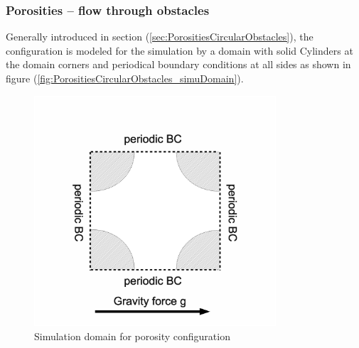 \documentclass[11pt,a4paper,twoside]{report}
\begin{document}
\subsubsection{Porosities -- flow through obstacles}
\label{sec:SimuSetup_flowThroughObstacles}

Generally introduced in section (\ref{sec:PorositiesCircularObstacles}), the configuration is modeled for the simulation by a domain with solid Cylinders at the domain corners and periodical boundary conditions at all sides as shown in figure (\ref{fig:PorositiesCircularObstacles_simuDomain}). 

\begin{figure}[!htbp]
  \centering
     \includegraphics[width=9cm]{Graphics/SimuSetup/Porosities}
  \caption{Simulation domain for porosity configuration}
  \label{fig:PorositiesCylindersSimuDomain}
\end{figure}
\end{document}
